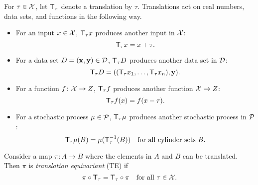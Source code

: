 \documentclass[12pt, twoside]{report}
\begin{document}
\pagebreak

\begin{definition}[Translation]
    \label{def:translation}
    For $\tau \in \mathcal{X}$,
    let $\T_\tau$ denote a translation by $\tau$.
    Translations act on real numbers, data sets, and functions in the following way.
    \setlength{\abovedisplayskip}{0.5\baselineskip}
    \setlength{\belowdisplayskip}{0\baselineskip}
    \begin{itemize}
        \item \vspace{-0.5em}For an input $x \in \mathcal{X}$, $\T_\tau x$ produces another input in $\mathcal{X}$:
            \begin{equation}
                \T_\tau x = x + \tau.
            \end{equation}
        \item For a data set $D = (\mathbf{x}, \mathbf{y}) \in \mathcal{D}$, $\T_\tau D$ produces another data set in $\mathcal{D}$:
            \begin{equation}
                \T_\tau D = ((\T_\tau x_1, \ldots, \T_\tau x_n), \vy).   
            \end{equation}
        \item For a function $f\colon \mathcal{X} \to Z$, $\T_\tau f$ produces another function $\mathcal{X} \to Z$:
            \begin{equation}
                \T_\tau f(x) = f(x - \tau).
            \end{equation}
        \item For a stochastic process $\mu \in \mathcal{P}$, $\T_\tau \mu$ produces another stochastic process in $\mathcal{P}$:
            \begin{equation} 
                \T_\tau \mu (B) = \mu(\T_\tau^{-1}(B)) \quad \text{for all cylinder sets $B$}.
            \end{equation}
    \end{itemize}
\end{definition}

\begin{definition}
    \label{def:translation_equivariance}
    Consider a map $\pi \colon A \to B$ where the elements in $A$ and $B$ can be translated.
    Then $\pi$ is \emph{translation equivariant} (TE) if
    \begin{equation}
        \pi \comp \T_\tau = \T_\tau \comp \pi
        \quad
        \text{for all $\tau \in \X$}.
    \end{equation}
\end{definition}
\end{document}
